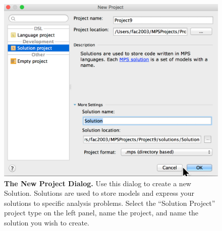 \begin{figure}
  \includegraphics[width=\figWidthNarrow]{figures/NewSolutionWizard.png}
  \caption[The New Project Dialog.]{\textbf{The New Project Dialog.} Use this dialog to create a new Solution. Solutions are used to store models and express your solutions to specific analysis problems. Select the ``Solution Project'' project type on the left panel, name the project, and name the solution you wish to create.
}\label{fig:NewProjectDialog}
\end{figure}
